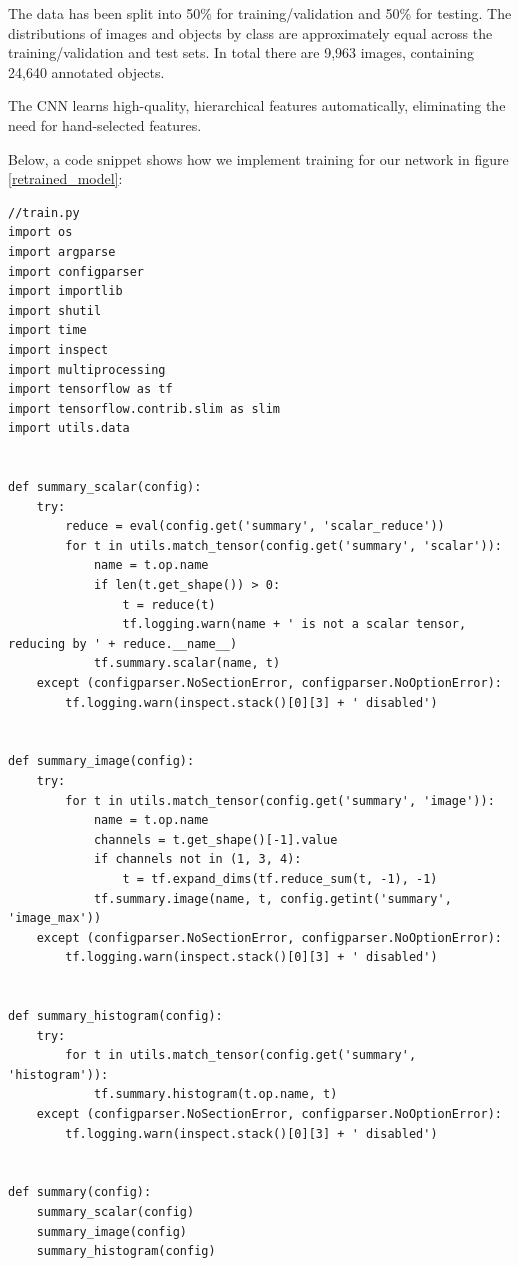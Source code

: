 The data has been split into 50\% for training/validation and 50\% for testing. The distributions of images and objects by class are approximately equal across the training/validation and test sets. In total there are 9,963 images, containing 24,640 annotated objects.

The CNN learns high-quality, hierarchical features automatically, eliminating the need for hand-selected features.

\vspace{5mm}
Below, a code snippet shows how we implement training for our network in figure \ref{retrained_model}:

\begin{lstlisting}
//train.py
import os
import argparse
import configparser
import importlib
import shutil
import time
import inspect
import multiprocessing
import tensorflow as tf
import tensorflow.contrib.slim as slim
import utils.data


def summary_scalar(config):
    try:
        reduce = eval(config.get('summary', 'scalar_reduce'))
        for t in utils.match_tensor(config.get('summary', 'scalar')):
            name = t.op.name
            if len(t.get_shape()) > 0:
                t = reduce(t)
                tf.logging.warn(name + ' is not a scalar tensor, reducing by ' + reduce.__name__)
            tf.summary.scalar(name, t)
    except (configparser.NoSectionError, configparser.NoOptionError):
        tf.logging.warn(inspect.stack()[0][3] + ' disabled')


def summary_image(config):
    try:
        for t in utils.match_tensor(config.get('summary', 'image')):
            name = t.op.name
            channels = t.get_shape()[-1].value
            if channels not in (1, 3, 4):
                t = tf.expand_dims(tf.reduce_sum(t, -1), -1)
            tf.summary.image(name, t, config.getint('summary', 'image_max'))
    except (configparser.NoSectionError, configparser.NoOptionError):
        tf.logging.warn(inspect.stack()[0][3] + ' disabled')


def summary_histogram(config):
    try:
        for t in utils.match_tensor(config.get('summary', 'histogram')):
            tf.summary.histogram(t.op.name, t)
    except (configparser.NoSectionError, configparser.NoOptionError):
        tf.logging.warn(inspect.stack()[0][3] + ' disabled')


def summary(config):
    summary_scalar(config)
    summary_image(config)
    summary_histogram(config)



\end{lstlisting}
